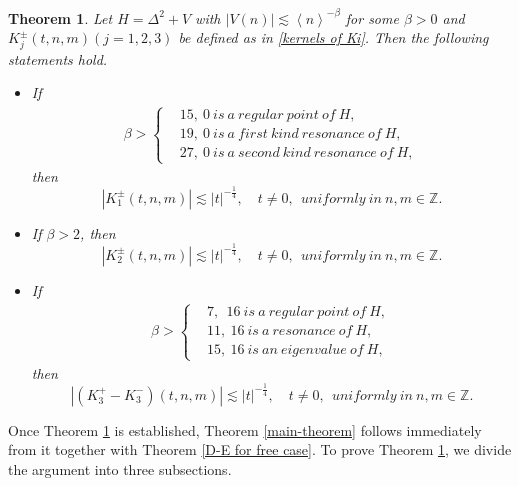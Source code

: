 \documentclass[reqno, 11pt]{amsart}
\newtheorem{theorem}[definition]{Theorem}
\newcommand\Z{\mathbb{Z}}
\numberwithin{equation}{section}
\begin{document}
\begin{theorem}\label{theorem of estimate of K1,K3}
 Let $H=\Delta^2+V$ with $|V(n)|\lesssim \left<n\right>^{-\beta}$ for some $\beta>0$ and $K^{\pm}_j(t,n,m)(j=1,2,3)$ be defined as in \eqref{kernels of Ki}. Then the following statements hold.
\begin{itemize}
\item[{\rm(i)}] If
\begin{align}\label{cases and conditions 0}
\beta>\left\{\begin{aligned}&15,\ 0\ is\ a\ regular\ point\ of\ H,\\
&19,\ 0\ is\ a\ first\ kind\ resonance\ of\ H,\\
&27,\ 0\ is\ a\ second\ kind\ resonance\ of\ H,\end{aligned}\right.
\end{align} then
\begin{equation}\label{esti for Kpm1}
\left|K^{\pm}_{1}(t,n,m)\right|\lesssim |t|^{-\frac{1}{4}}, \quad t\neq0,\  \ uniformly\ in\ n,m\in\Z.
\end{equation}
\item[{\rm(ii)}] If $\beta>2$, then
\begin{equation}\label{esti for Kpm2}
\left|K^{\pm}_{2}(t,n,m)\right|\lesssim |t|^{-\frac{1}{4}}, \quad t\neq0,\  \ uniformly\ in\ n,m\in\Z.
\end{equation}
\item[{\rm(iii)}] If
\begin{align}\label{cases and conditions 16}
\beta>\left\{\begin{aligned}&7,\ \  16\ is\ a\ regular\ point\ of\ H,\\
&11,\ 16\ is\ a\ resonance\ of\ H,\\
&15,\ 16\ is\ an\ eigenvalue\ of\ H,\end{aligned}\right.
\end{align}
then
\begin{equation}\label{esti for Kpm3}
\left|(K^{+}_{3}-K^{-}_3)(t,n,m)\right|\lesssim |t|^{-\frac{1}{4}}, \quad t\neq0,\  \ uniformly\ in\ n,m\in\Z.
\end{equation}
\end{itemize}
\end{theorem}
Once Theorem \ref{theorem of estimate of K1,K3} is established, Theorem \ref{main-theorem} follows immediately from it together with Theorem \ref{D-E for free case}. To prove Theorem \ref{theorem of estimate of K1,K3}, we divide the argument into three subsections.
\end{document}
